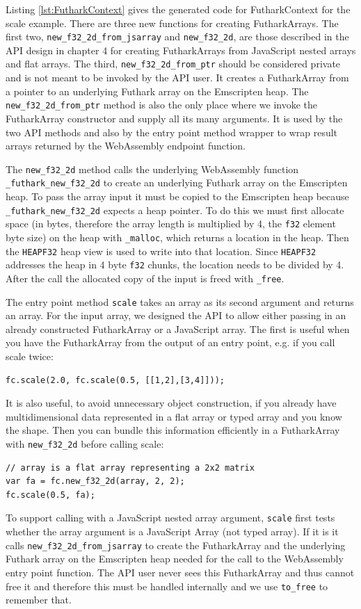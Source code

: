 \documentclass[11pt]{book}
\begin{document}
Listing \ref{lst:FutharkContext} gives the generated code for FutharkContext for the scale example. There are three new functions for creating FutharkArrays. The first two, \texttt{new\_f32\_2d\_from\_jsarray} and \texttt{new\_f32\_2d}, are those described in the API design in chapter 4 for creating FutharkArrays from JavaScript nested arrays and flat arrays. The third, \texttt{new\_f32\_2d\_from\_ptr} should be considered private and is not meant to be invoked by the API user. It creates a FutharkArray from a pointer to an underlying Futhark array on the Emscripten heap. The \texttt{new\_f32\_2d\_from\_ptr} method is also the only place where we invoke the FutharkArray constructor and supply all its many arguments. It is used by the two API methods and also by the entry point method wrapper to wrap result arrays returned by the WebAssembly endpoint function.

The \texttt{new\_f32\_2d} method calls the underlying WebAssembly function \\\texttt{\_futhark\_new\_f32\_2d} to create an underlying Futhark array on the Emscripten heap. To pass the array input it must be copied to the Emscripten heap because \texttt{\_futhark\_new\_f32\_2d} expects a heap pointer. To do this we must first allocate space (in bytes, therefore the array length is multiplied by 4, the \texttt{f32} element byte size) on the heap with \texttt{\_malloc}, which returns a location in the heap. Then the \texttt{HEAPF32} heap view is used to write into that location. 
Since \texttt{HEAPF32} addresses the heap in 4 byte \texttt{f32} chunks, the location needs to be divided by 4.
After the call the allocated copy of the input is freed with \texttt{\_free}.

The entry point method \texttt{scale} takes an array as its second argument and returns an array. 
For the input array, we designed the API to allow either passing in an already constructed FutharkArray or a JavaScript array. The first is useful when you have the FutharkArray from the output of an entry point, e.g. if you call scale twice:
\begin{verbatim}
fc.scale(2.0, fc.scale(0.5, [[1,2],[3,4]]));
\end{verbatim}
It is also useful, to avoid unnecessary object construction, if you already have multidimensional data represented in a flat array or typed array and you know the shape. Then you can bundle this information efficiently in a FutharkArray with \texttt{new\_f32\_2d} before calling scale:
\begin{verbatim}
// array is a flat array representing a 2x2 matrix
var fa = fc.new_f32_2d(array, 2, 2);
fc.scale(0.5, fa);
\end{verbatim}
To support calling with a JavaScript nested array argument, \texttt{scale} first tests whether the array argument is a JavaScript Array (not typed array). If it is it calls \texttt{new\_f32\_2d\_from\_jsarray} to create the FutharkArray and the underlying Futhark array on the Emscripten heap needed for the call to the WebAssembly entry point function. The API user never sees this FutharkArray and thus cannot free it and therefore this must be handled internally and we use \texttt{to\_free} to remember that. %
\end{document}
